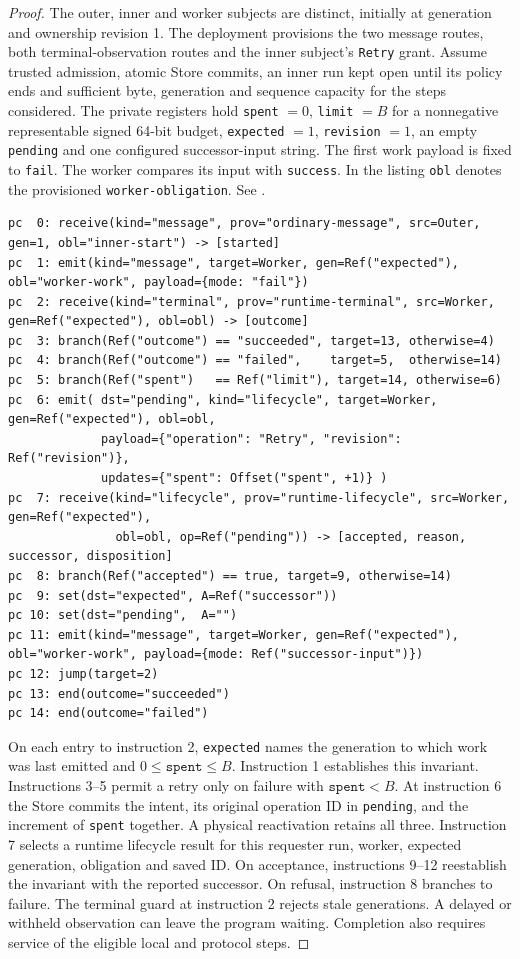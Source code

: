 \documentclass[11pt,a4paper]{article}
\theoremstyle{definition}
\theoremstyle{remark}
\begin{document}
\begin{proof}
The outer, inner and worker subjects are distinct, initially at generation and ownership revision 1. The deployment provisions the two message routes, both terminal-observation routes and the inner subject's \texttt{Retry} grant. Assume trusted admission, atomic Store commits, an inner run kept open until its policy ends and sufficient byte, generation and sequence capacity for the steps considered. The private registers hold \texttt{spent} $=0$, \texttt{limit} $=B$ for a nonnegative representable signed 64-bit budget, \texttt{expected} $=1$, \texttt{revision} $=1$, an empty \texttt{pending} and one configured successor-input string. The first work payload is fixed to \texttt{fail}. The worker compares its input with \texttt{success}. In the listing \texttt{obl} denotes the provisioned \texttt{worker-obligation}. See .
\begin{lstlisting}[style=alancode]
pc  0: receive(kind="message", prov="ordinary-message", src=Outer, gen=1, obl="inner-start") -> [started]
pc  1: emit(kind="message", target=Worker, gen=Ref("expected"), obl="worker-work", payload={mode: "fail"})
pc  2: receive(kind="terminal", prov="runtime-terminal", src=Worker, gen=Ref("expected"), obl=obl) -> [outcome]
pc  3: branch(Ref("outcome") == "succeeded", target=13, otherwise=4)
pc  4: branch(Ref("outcome") == "failed",    target=5,  otherwise=14)
pc  5: branch(Ref("spent")   == Ref("limit"), target=14, otherwise=6)
pc  6: emit( dst="pending", kind="lifecycle", target=Worker, gen=Ref("expected"), obl=obl,
             payload={"operation": "Retry", "revision": Ref("revision")},
             updates={"spent": Offset("spent", +1)} )
pc  7: receive(kind="lifecycle", prov="runtime-lifecycle", src=Worker, gen=Ref("expected"),
               obl=obl, op=Ref("pending")) -> [accepted, reason, successor, disposition]
pc  8: branch(Ref("accepted") == true, target=9, otherwise=14)
pc  9: set(dst="expected", A=Ref("successor"))
pc 10: set(dst="pending",  A="")
pc 11: emit(kind="message", target=Worker, gen=Ref("expected"), obl="worker-work", payload={mode: Ref("successor-input")})
pc 12: jump(target=2)
pc 13: end(outcome="succeeded")
pc 14: end(outcome="failed")
\end{lstlisting}

On each entry to instruction 2, \texttt{expected} names the generation to which work was last emitted and $0\leq \mathtt{spent}\leq B$. Instruction 1 establishes this invariant. Instructions 3--5 permit a retry only on failure with $\mathtt{spent}<B$. At instruction 6 the Store commits the intent, its original operation ID in \texttt{pending}, and the increment of \texttt{spent} together. A physical reactivation retains all three. Instruction 7 selects a runtime lifecycle result for this requester run, worker, expected generation, obligation and saved ID. On acceptance, instructions 9--12 reestablish the invariant with the reported successor. On refusal, instruction 8 branches to failure. The terminal guard at instruction 2 rejects stale generations. A delayed or withheld observation can leave the program waiting. Completion also requires service of the eligible local and protocol steps.
\end{proof}
\end{document}
